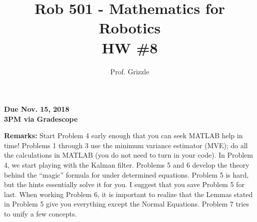\documentclass[letterpaper]{article}
\author{Prof. Grizzle}
\title{Rob 501 - Mathematics for Robotics\\
HW \#8}
\begin{document}
\date{}
\maketitle


 \newcommand{\trace}{\mathrm{trace}}
\newcommand{\real}{\mathbb R}  %
\newcommand{\nat}{\mathbb N}   %
\newcommand{\cp}{\mathbb C}    %
\newcommand{\ds}{\displaystyle}
\newcommand{\mf}[2]{\frac{\ds #1}{\ds #2}}
\newcommand{\Nagy}[2]{{Nagy, Page~#1, }{Prob.~#2}}
\newcommand{\spanof}[1]{\textrm{span} \{ #1 \}}
 \newcommand{\cov}{\mathrm{cov}}
 \newcommand{\E}{\mathcal{E}}
\parindent 0pt


\begin{flushright}
{\bfseries Due Nov. 15, 2018} \\
{\bfseries 3PM via Gradescope} \\[3mm]
\end{flushright}

\noindent \textbf{Remarks:}  Start Problem 4 early enough that you can seek MATLAB help in time! Problems 1 through 3 use the minimum variance estimator (MVE); do all the calculations in MATLAB (you do not need to turn in your code).  In Problem 4, we start playing with the Kalman filter. Problems 5 and 6 develop the theory behind the ``magic'' formula for under determined equations.  Problem 5 is hard, but the hints essentially solve it for you. I suggest that you save Problem 5 for last. When working Problem 6, it is important to realize that the Lemmas stated in Problem 5 give you everything except the Normal Equations. Problem 7 tries to unify a few concepts.
\end{document}

